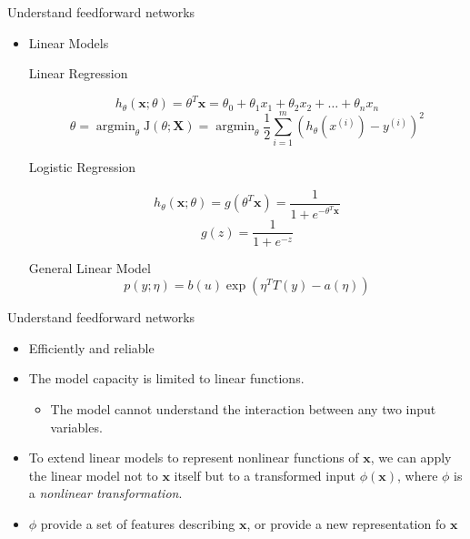 \documentclass[10pt]{beamer}
\begin{document}
	\begin{frame}{Understand feedforward networks}
		\begin{itemize}
			\item Linear Models
			\begin{exampleblock}{Linear Regression}
				\vspace{-2em}
				\begin{center}
					$$h_\theta(\bm{x};\theta)=\theta ^T\bm{x}=\theta_0+\theta_1x_1+\theta_2x_2+\dots+\theta_nx_n$$	
					\vspace{-2em}
					$$\theta=\mathop{\arg\min}_{\theta}\mathrm{J}(\theta;\bm{X})=\mathop{\arg\min}_{\theta}\frac{1}{2}\sum^{m}_{i=1}(h_\theta(x^{(i)})-y^{(i)})^2$$
					\vspace{-1em}
				\end{center}
			\end{exampleblock}
			
			\begin{exampleblock}{Logistic Regression}
				\vspace{-1.5em}
				\begin{center}
					$$h_\theta(\bm{x};\theta)=g(\theta^T\bm{x})=\frac{1}{1+e^{-\theta^T\bm{x}}}$$
					\vspace{-1.5em}
					$$g(z)=\frac{1}{1+e^{-z}}$$
					\vspace{-1.5em}
				\end{center}
			\end{exampleblock}
			
			\begin{exampleblock}{General Linear Model}
				$$p(y;\eta)=b(u)\exp(\eta^TT(y)-a(\eta))$$
			\end{exampleblock}
		\end{itemize}
		
	\end{frame}
	
	\begin{frame}{Understand feedforward networks}
		\begin{itemize}
			\item Efficiently and reliable
			\item The model capacity is limited to linear functions.
			\begin{itemize}
				\item The model cannot understand the interaction between any two input variables.
			\end{itemize}
			\item To extend linear models to represent nonlinear functions of $\bm{x}$, we can apply the linear model not to $\bm{x}$ itself but to a transformed input $\phi(\bm{x})$, where $\phi$ is a \emph{nonlinear transformation}.
			\item $\phi$ provide a set of features describing $\bm{x}$, or provide a new representation fo $\bm{x}$
		\end{itemize}
	\end{frame}
	
\end{document}
